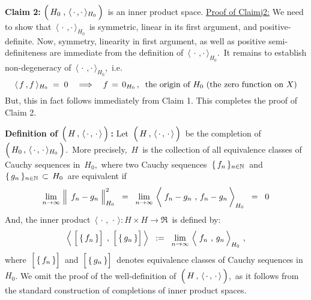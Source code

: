 \vskip 0.5cm
\noindent
\textbf{Claim 2:}\quad
$\left(\,\overset{{\color{white}.}}{H_{0}}\;,\,\langle\,\cdot\,,\cdot\,\rangle_{H_{0}}\,\right)$\,
is an inner product space.
\vskip 0.2cm
\noindent
\underline{Proof of Claim{\color{white}j}2:}
\vskip0.2cm
\noindent
We need to show that \,$\langle\,\cdot\,,\cdot\,\rangle_{H_{0}}$\,
is symmetric, linear in its first argument, and positive-definite.
Now, symmetry, linearity in first argument, as well as positive semi-definiteness
are immediate from the definition of \,$\langle\,\cdot\,,\cdot\,\rangle_{H_{0}}$.\,
It remains to establish non-degeneracy of \,$\langle\,\cdot\,,\cdot\,\rangle_{H_{0}}$,\, i.e.
\begin{equation*}
\langle\,f\,,f\,\rangle_{H_{0}} \; = \; 0
\quad\Longrightarrow\quad
	f \,=\, 0_{H_{0}}\,, \;\;\textnormal{the origin of $H_{0}$ (the zero function on $X$)}
\end{equation*}
But, this in fact follows immediately from Claim 1.
This completes the proof of Claim 2.

\noindent
\vskip 0.8cm
\noindent
\textbf{Definition of $\left(\,\overset{{\color{white}.}}{H}\,,\,\langle\,\cdot\,,\,\cdot\,\rangle\,\right)$\,:}
\vskip 0.1cm
\noindent
Let
\,$\left(\,\overset{{\color{white}.}}{H}\,,\,\langle\,\cdot\,,\,\cdot\,\rangle\,\right)$\,
be the completion of 
\,$\left(\,\overset{{\color{white}.}}{H_{0}}\,,\,\langle\,\cdot\,,\,\cdot\,\rangle_{H_{0}}\,\right)$.\,
More precisely, \,$H$\, is the collection of all equivalence classes of Cauchy sequences in \,$H_{0}$,\,
where two Cauchy sequences
\,$\{\,f_{n}\,\}_{n\in\mathbb{N}}$\, and \,$\{\,g_{n}\,\}_{n\in\mathbb{N}} \,\subset\, H_{0}$\,
are equivalent if
\begin{equation*}
\underset{n\rightarrow\infty}{\lim}\,
	\left\Vert\;\,
		f_{n} \overset{{\color{white}.}}{-} g_{n}
		\;\right\Vert_{H_{0}}^{2}
\;\; = \;\;
\underset{n\rightarrow\infty}{\lim}\,
	\left\langle\;
		f_{n} \overset{{\color{white}1}}{-} g_{n}
		\;\overset{{\color{white}1}}{,}\;
		f_{n} - g_{n}
		\,\right\rangle_{H_{0}}
\;\; = \;\; 0
\end{equation*}
And, the inner product
\,$\langle\,\cdot\,,\,\cdot\,\rangle : H \times H \longrightarrow \Re$\,
is defined by:
\begin{equation*}
	\left\langle\;
		\left[\,\{\,\overset{{\color{white}.}}{f_{n}}\,\}\right]
		\;,\;
		\left[\,\{\,\overset{{\color{white}1}}{g_{n}}\,\}\right]
		\,\right\rangle
\;\; := \;\;
\underset{n\rightarrow\infty}{\lim}\,
	\left\langle\;
		\overset{{\color{white}.}}{f_{n}}
		\;\overset{{\color{white}1}}{,}\;
		g_{n}
		\,\right\rangle_{H_{0}}\,,
\end{equation*}
where
\,$\left[\,\{\,\overset{{\color{white}.}}{f_{n}}\,\}\right]$\,
and
\,$\left[\,\{\,\overset{{\color{white}1}}{g_{n}}\,\}\right]$\,
denotes equivalence classes of Cauchy sequences in \,$H_{0}$.
We omit the proof of the well-definition of
\,$\left(\,\overset{{\color{white}.}}{H}\,,\,\langle\,\cdot\,,\,\cdot\,\rangle\,\right)$,\,
as it follows from the standard construction of completions of inner product spaces.

